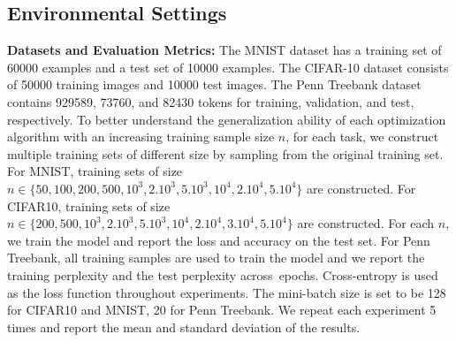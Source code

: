 \documentclass[11pt]{article}
\begin{document}
\vspace{-0.05in}
\subsection{Environmental Settings}
\vspace{-0.05in}

\textbf{Datasets and Evaluation Metrics:}  The MNIST dataset has a training set of 60000 examples and a test set of 10000 examples. The CIFAR-10 dataset consists of 50000 
training images and 10000 test images. The Penn Treebank dataset contains 929589, 73760, and 82430 tokens for training, validation, and test,  respectively.
To better understand the generalization ability of each optimization algorithm with an increasing training sample size $n$, for each task, we construct multiple training sets of different size by sampling from the original training set. For MNIST, training sets of size $n \in \{50, 100, 200, 500, 10^3, 2.10^3, 5.10^3, 10^4, 2.10^4, 5.10^4 \}$ are constructed. For CIFAR10, training sets of size $n \in \{ 200, 500, 10^3, 2.10^3, 5.10^3, 10^4, 2.10^4,3.10^4, 5.10^4\}$ are constructed. 
For each $n$, we train the model and report the loss and accuracy on the test set.  
For Penn Treebank, all training samples are used to train the model and we report the training perplexity and the test perplexity across~epochs. 
Cross-entropy is used as the loss function throughout experiments. The mini-batch size is set to be 128 for CIFAR10 and MNIST, 20 for Penn Treebank. 
We repeat each experiment 5 times and report the mean and standard deviation of the results.
\end{document}

